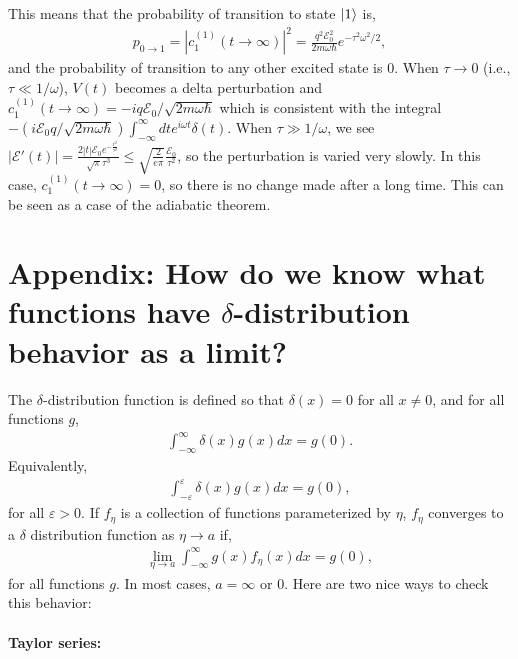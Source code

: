 \documentclass[10pt]{article}
\newcommand{\1}{\mathbf 1}
\begin{document}
This means that the probability of transition to state $\ket{1}$ is,
\begin{align}
	p_{0 \to 1} =
	|c_1^{(1)}(t \to \infty)|^2 
	=
	\frac{q^2\mathcal{E}_0^2}{2 m \omega \hbar}
	e^{-\tau^2 \omega^2/2},
\end{align}
and the probability of transition to any other excited state is $0$.
When $\tau \to 0$ (i.e., $\tau \ll 1/\omega$), $V(t)$ becomes a delta perturbation and $c_1^{(1)}(t \to \infty)
=
-iq\mathcal{E}_0/\sqrt{2m \omega \hbar}$ which is consistent with the integral $-(i \mathcal{E}_0q/\sqrt{2m \omega \hbar}) \int_{-\infty}^\infty 
dt
e^{i\omega t}
\delta(t).
$
When $\tau \gg 1/\omega$, we see $|\mathcal{E}'(t)| = \frac{2 |t| \mathcal{E}_0 e^{-\frac{t^2}{\tau ^2}}}{\sqrt{\pi } \tau ^3}
\leq
\sqrt{\frac{2}{e \pi }}\frac{ \mathcal{E}_0}{\tau ^2}
$,
so the perturbation is varied very slowly.
In this case, $c_1^{(1)}(t \to \infty) = 0$, so there is no change made after a long time.
This can be seen as a case of the adiabatic theorem.

\section*{Appendix: How do we know what functions have $\delta$-distribution behavior as a limit?}

The $\delta$-distribution function is defined so that $\delta(x) = 0$ for all $x \ne 0$, and for all functions $g$,
\begin{align}
	\int_{-\infty}^\infty \delta(x) g(x) dx = g(0).
\end{align}
Equivalently,
\begin{align}
	\int_{-\varepsilon}^{\varepsilon} \delta(x) g(x) dx = g(0),
\end{align}
for all $\varepsilon > 0$.
If $f_\eta$ is a collection of functions parameterized by $\eta$, $f_\eta$ converges to a $\delta$ distribution function as $\eta \to a$ if,
\begin{align}
	\lim_{\eta \to a}
	\int_{-\infty}^\infty g(x) f_\eta(x) dx
	=
	g(0),
\end{align}
for all functions $g$.
In most cases, $a = \infty$ or $0$.
Here are two nice ways to check this behavior:

\paragraph{Taylor series:}
\end{document}
